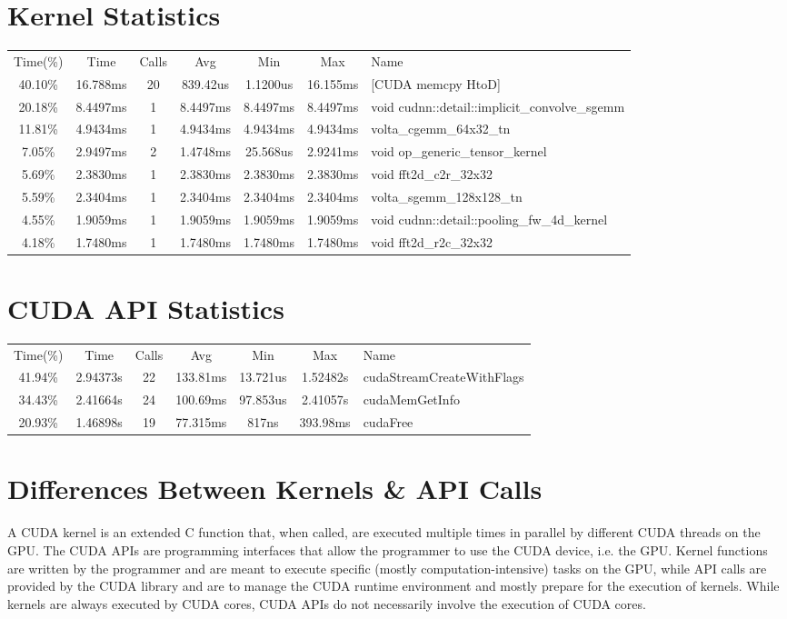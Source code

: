 \documentclass{article}
\begin{document}
\section{Kernel Statistics}
\begin{tabular}{ccccccl}
 Time(\%) & Time & Calls & Avg & Min &   Max  &  Name \tabularnewline
  40.10\% &  16.788ms &  20 & 839.42us & 1.1200us & 16.155ms & [CUDA memcpy HtoD] \tabularnewline
  20.18\% & 8.4497ms  &  1 &  8.4497ms & 8.4497ms & 8.4497ms & void cudnn::detail::implicit\_convolve\_sgemm \tabularnewline
  11.81\% & 4.9434ms  &  1 &  4.9434ms & 4.9434ms & 4.9434ms & volta\_cgemm\_64x32\_tn \tabularnewline
   7.05\% & 2.9497ms  &  2 &  1.4748ms & 25.568us & 2.9241ms & void op\_generic\_tensor\_kernel \tabularnewline
   5.69\% & 2.3830ms  &  1 &  2.3830ms & 2.3830ms & 2.3830ms & void fft2d\_c2r\_32x32 \tabularnewline
   5.59\% & 2.3404ms  &  1 &  2.3404ms & 2.3404ms & 2.3404ms & volta\_sgemm\_128x128\_tn \tabularnewline
   4.55\% & 1.9059ms  &  1 &  1.9059ms & 1.9059ms & 1.9059ms & void cudnn::detail::pooling\_fw\_4d\_kernel \tabularnewline
   4.18\% & 1.7480ms  &  1 &  1.7480ms & 1.7480ms & 1.7480ms & void fft2d\_r2c\_32x32
\end{tabular}

\section{CUDA API Statistics}
\begin{tabular}{ccccccl}
Time(\%)   &   Time   &  Calls   &    Avg   &    Min    &   Max  &  Name \tabularnewline
41.94\% & 2.94373s    &    22 & 133.81ms & 13.721us & 1.52482s & cudaStreamCreateWithFlags \tabularnewline
 34.43\% & 2.41664s    &    24 & 100.69ms & 97.853us & 2.41057s & cudaMemGetInfo \tabularnewline
 20.93\% & 1.46898s    &    19 & 77.315ms &    817ns & 393.98ms & cudaFree \tabularnewline
\end{tabular}

\section{Differences Between Kernels \& API Calls} %
A CUDA kernel is an extended C function that, when called, are executed multiple times in parallel by different CUDA threads on the GPU.
The CUDA APIs are programming interfaces that allow the programmer to use the CUDA device, i.e. the GPU.
Kernel functions are written by the programmer and are meant to execute specific (mostly computation-intensive) tasks on the GPU,
while API calls are provided by the CUDA library and are to manage the CUDA runtime environment and mostly prepare for the execution of kernels.
While kernels are always executed by CUDA cores, CUDA APIs do not necessarily involve the execution of CUDA cores.
\end{document}
